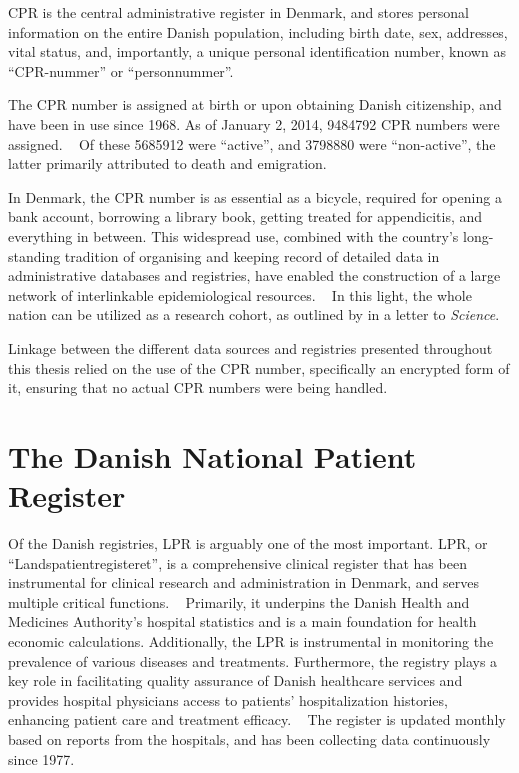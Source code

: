 \Ac{CPR} is the central administrative register in Denmark,
and stores personal information on the entire Danish population,
including birth date, sex, addresses, vital status, 
and, importantly, a unique personal identification number, 
known as \enquote{\ac{CPR}-nummer} or \enquote{personnummer}.
~\autocite{schmidtDanish2014}

The \ac{CPR} number is assigned at birth or upon obtaining Danish citizenship, 
and have been in use since 1968.
As of January 2, 2014, 
\num{9484792} \ac{CPR} numbers were assigned.
~\autocite{schmidtDanish2014}
Of these \num{5685912} were \enquote{active},
and \num{3798880} were \enquote{non-active},
the latter primarily attributed to death and emigration.
~\autocite{schmidtDanish2014}

In Denmark, the \ac{CPR} number is as essential as a bicycle, 
required for opening a bank account, 
borrowing a library book, 
getting treated for appendicitis, and everything in between.
This widespread use, 
combined with the country's long-standing tradition
of organising and keeping record of detailed data in 
administrative databases and registries,
have enabled the construction of a large network
of interlinkable epidemiological resources.
~\autocite{schmidtDanish2019}
In this light, the whole nation can be utilized as a research cohort,
as outlined by \textcite{frankEpidemiology2000} in a letter
to \textit{Science}.

Linkage between the different data sources and registries presented 
throughout this thesis relied on the use of the \ac{CPR} number,
specifically an encrypted form of it, ensuring that no actual \ac{CPR}
numbers were being handled.

\section{The Danish National Patient Register}

Of the Danish registries, \ac{LPR} is arguably one of the most important.
\ac{LPR}, or \enquote{Landspatientregisteret}, 
is a comprehensive clinical register that has
been instrumental for clinical research and administration in Denmark,
and serves multiple critical functions.
~\autocite{schmidtDanish2015}
Primarily, it underpins the Danish Health and Medicines Authority's hospital
statistics and is a main foundation for health economic calculations.
Additionally, the \ac{LPR} is instrumental in monitoring the
prevalence of various diseases and treatments. 
Furthermore, the registry plays a key role in
facilitating quality assurance of Danish healthcare services and provides
hospital physicians access to patients' hospitalization histories, enhancing
patient care and treatment efficacy.
~\autocite{schmidtDanish2015}
The register is updated monthly based on reports from the hospitals,
and has been collecting data continuously since 1977.
~\autocite{schmidtDanish2015}

